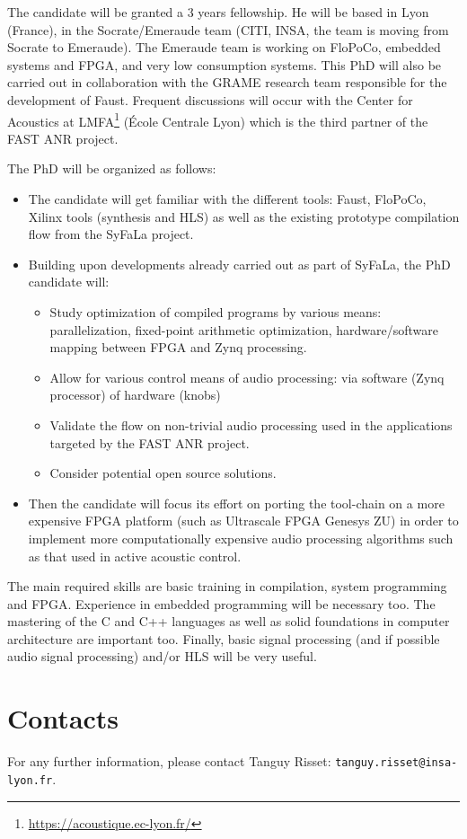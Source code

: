 \documentclass[a4paper,francais,11]{article}
\begin{document}
The candidate will be granted a 3 years fellowship. He will be based in Lyon (France), in the Socrate/Emeraude team (CITI, INSA, the team is moving from Socrate to Emeraude). The Emeraude team is working on FloPoCo, embedded systems and FPGA, and very low consumption systems. This PhD will also be carried out in collaboration with the GRAME research team responsible for the development of Faust. Frequent discussions will occur with the Center for Acoustics at LMFA\footnote{\url{https://acoustique.ec-lyon.fr/}} (École Centrale Lyon) which is the third partner of the FAST ANR project.


The PhD will be organized as follows:
\begin{itemize}
\item  The candidate will get familiar with the different tools: Faust, FloPoCo, Xilinx tools (synthesis and HLS) as well as the existing prototype compilation flow from the SyFaLa project.
\item Building upon developments already carried out as part of SyFaLa, the PhD candidate will:
  \begin{itemize}
  \item Study optimization of compiled programs by various means: parallelization, fixed-point arithmetic optimization, hardware/software mapping between FPGA and Zynq processing.
  \item Allow for various control means of audio processing: via software (Zynq processor) of hardware (knobs)
  \item Validate the flow on non-trivial audio processing used in the applications targeted by the FAST ANR project.
  \item Consider potential open source solutions.
  \end{itemize}
\item Then the candidate will focus its effort on porting the tool-chain on a more expensive FPGA platform (such as Ultrascale FPGA Genesys ZU) in order to implement more computationally expensive audio processing algorithms such as that used in active acoustic control. 
\end{itemize}

The main required skills are basic training in
compilation, system programming and FPGA. Experience in 
embedded programming will be necessary too. The mastering of the C and C++ languages as well as solid foundations in computer architecture are important too. Finally, basic signal processing (and if possible audio signal processing) and/or HLS will be very useful. 

\section*{Contacts}

For any further information, please contact Tanguy Risset: \texttt{tanguy.risset@insa-lyon.fr}.





 
\end{document}
